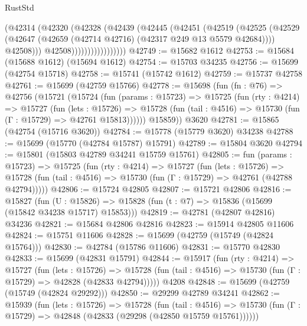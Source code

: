 \begin{lexlean}{RustStd}
\begin{coremodule}
                            (@42314
                              (@42320
                                (@42328
                                  (@42439
                                    (@42445
                                      (@42451
                                        (@42519
                                          (@42525
                                            (@42529
                                              (@42647
                                                (@42659
                                                  (@42714 @42716)
                                                  (@42317 @249 @13 @5579 @42684))))
                                            @42508)))
                                      @42508)))))))))))))))))
@42749 := @15682 @1612
@42753 := @15684 (@15688 @1612) (@15694 @1612)
@42754 := @15703 @34235
@42756 := @15699 (@42754 @15718)
@42758 := @15741 (@15742 @1612)
@42759 := @15737 @42758
@42761 := @15699 (@42759 @15766)
@42778 := @15698
    (fun (fn : @76) =>
    @42756
      (@15721
        (@15724
          (fun (params : @15723) =>
          @15725
            (fun (rty : @4214) =>
            @15727
              (fun (lets : @15726) =>
              @15728 (fun (tail : @4516) => @15730 (fun (Γ : @15729) => @42761 @15813))))))
        @15859))
    @3620
@42781 := @15865 (@42754 (@15716 @3620))
@42784 := @15778 (@15779 @3620) @34238
@42788 := @15699 (@15770 (@42784 @15787) @15791)
@42789 := @15804 @3620
@42794 := @15801 (@15803 @42789 @34241 @15759 @15761)
@42805 := fun (params : @15723) =>
  @15725
    (fun (rty : @4214) =>
    @15727
      (fun (lets : @15726) =>
      @15728 (fun (tail : @4516) => @15730 (fun (Γ : @15729) => @42761 (@42788 @42794)))))
@42806 := @15724 @42805
@42807 := @15721 @42806
@42816 := @15827
    (fun (U : @15826) => @15828 (fun (t : @7) => @15836 (@15699 (@15842 @34238 @15717) @15853)))
@42819 := @42781 (@42807 @42816) @34236
@42821 := @15684 @42806 @42816
@42823 := @15914 @42805 @11606
@42824 := @15751 @11606
@42828 := @15699 (@42759 (@15749 (@42824 @15764)))
@42830 := @42784 (@15786 @11606)
@42831 := @15770 @42830
@42833 := @15699 (@42831 @15791)
@42844 := @15917
    (fun (rty : @4214) =>
    @15727
      (fun (lets : @15726) =>
      @15728 (fun (tail : @4516) => @15730 (fun (Γ : @15729) => @42828 (@42833 @42794)))))
    @4208
@42848 := @15699 (@42759 (@15749 (@42824 @29292)))
@42850 := @29299 @42789 @34241
@42862 := @15939
    (fun (lets : @15726) =>
    @15728
      (fun (tail : @4516) =>
      @15730 (fun (Γ : @15729) => @42848 (@42833 (@29298 (@42850 @15759 @15761))))))

\end{coremodule}
\end{lexlean}
